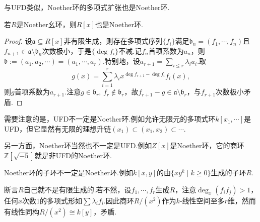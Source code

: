与UFD类似，Noether环的多项式扩张也是Noether环.
\begin{thm}[(Hilbert基定理)]
    若$R$是Noether幺环，则$R[x]$也是Noether环.
\end{thm}
\begin{proof}
    设$\mathfrak{a}\subseteq R[x]$非有限生成，则存在多项式序列$\{f_i\}$满足$\mathfrak{b}_n=(f_1,\cdots,f_n)$且$f_{n+1}\in\mathfrak{a}\setminus\mathfrak{b}_n$次数极小，于是$\{\deg f_i\}$不减.记$f_n$首项系数为$a_n$，则$\mathfrak{b}:=(a_1,a_2,\cdots)=(a_1,\cdots,a_r)$.特别地，设$a_{r+1}=\sum_{i\le r}\lambda_ia_i$.取
    \[
        g(x)=\sum_{i=1}^r\lambda_ix^{\deg f_{r+1}-\deg f_i}f_i(x),
    \]
    则$g$首项系数为$a_{r+1}$.注意$g\in\mathfrak{b}_r,\,f_r\notin\mathfrak{b}_r$，故$f_{r+1}-g\in\mathfrak{a}\setminus\mathfrak{b}_r$，与$f_{r+1}$次数极小矛盾.
\end{proof}
\begin{remark}
    需要注意的是，UFD不一定是Noether环.例如允许无限元的多项式环$k[x_1,\cdots]$是UFD，但它显然有无限的理想升链$(x_1)\subset(x_1,x_2)\subset\cdots$.

    另一方面，Noether环当然也不一定是UFD.例如$Z[x]$是Noether环，它的商环$\mathbb{Z}[\sqrt{-5}]$就是非UFD的Noether环.
\end{remark}
\begin{remark}
    Noether环的子环不一定是Noether环.例如$k[x,y]$的由$\{xy^k\mid k\ge 0\}$生成的子环$R$.

    断言$R$自己就不是有限生成的.若不然，设$f_1,\cdots,f_r$生成$R$，注意$\deg_x(f_if_j)>1$，任何$x$次数$1$的多项式形如$\sum\lambda_if_i$.因此商环$R/(x^2)$作为$k$-线性空间至多$r$维，然而有线性同构$R/(x^2)\cong k[y]$，矛盾.
\end{remark}